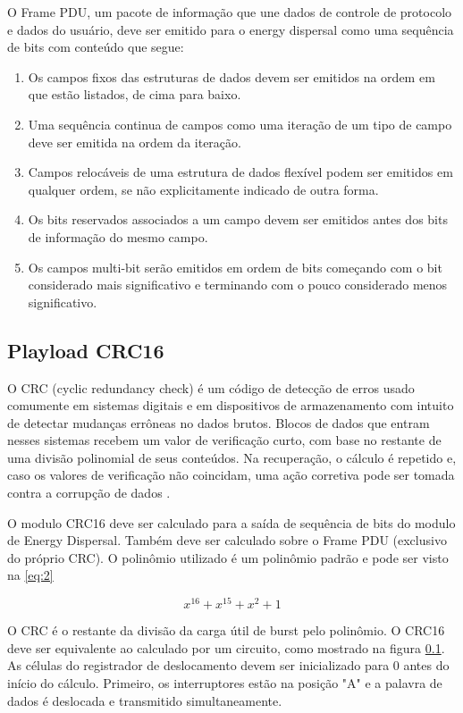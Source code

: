 O Frame PDU, um pacote de informação que une dados de controle de protocolo e dados do usuário, deve ser emitido para o energy dispersal como uma sequência de bits com conteúdo que segue:
\begin{enumerate}{}
	\item Os campos fixos das estruturas de dados devem ser emitidos na ordem em que estão listados, de cima para baixo.
	\item Uma sequência continua de campos como uma iteração de um tipo de campo deve ser emitida na ordem da iteração.
	\item Campos relocáveis de uma estrutura de dados flexível podem ser emitidos em qualquer ordem, se não explicitamente indicado de outra forma.
	\item Os bits reservados associados a um campo devem ser emitidos antes dos bits de informação do mesmo campo.
	\item Os campos multi-bit serão emitidos em ordem de bits começando com o bit considerado mais significativo e terminando com o pouco considerado menos significativo.
\end{enumerate}

\subsection{Playload CRC16}
\label{sec:crc16}
O CRC (cyclic redundancy check) é um código de detecção de erros usado comumente em sistemas digitais e em dispositivos de armazenamento com intuito de detectar mudanças errôneas no dados brutos. Blocos de dados que entram nesses sistemas recebem um valor de verificação curto, com base no restante de uma divisão polinomial de seus conteúdos. Na recuperação, o cálculo é repetido e, caso os valores de verificação não coincidam, uma ação corretiva pode ser tomada contra a corrupção de dados \cite{Bill}.  

O modulo CRC16 deve ser calculado para a saída de sequência de bits do modulo de Energy Dispersal. Também deve ser calculado sobre o Frame PDU (exclusivo do próprio CRC). O polinômio utilizado é um polinômio padrão e pode ser visto na \ref{eq:2}

\begin{equation}\label{eq:2}
x^{16}+x^{15}+x^2+1
\end{equation}

O CRC é o restante da divisão da carga útil de burst pelo polinômio.
O CRC16 deve ser equivalente ao calculado por um circuito, como mostrado na figura \ref{sec:crc16}. As células do registrador de deslocamento devem ser inicializado para 0 antes do início do cálculo. Primeiro, os interruptores estão na posição "A" e a palavra de dados é deslocada e transmitido simultaneamente. 

